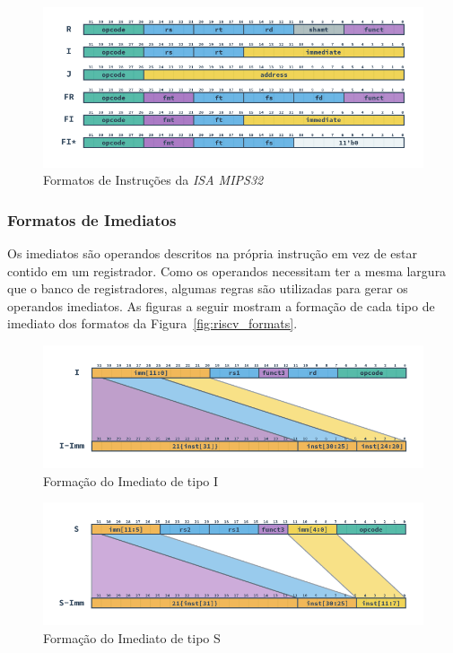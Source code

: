         \begin{figure}[H]
        \centering
            \includegraphics[width=1\linewidth]{../images/MIPS_Formats.png}
            \caption{Formatos de Instruções da \textit{ISA MIPS32}
                }\label{fig:mips_formats}
        \end{figure}

        \subsubsection{Formatos de Imediatos}
        { Os imediatos são operandos descritos na própria instrução em vez de estar
            contido em um registrador. Como os operandos necessitam ter a mesma largura
            que o banco de registradores, algumas regras são utilizadas para gerar os
            operandos imediatos. As figuras a seguir mostram a formação de cada tipo de
            imediato dos formatos da Figura~\ref{fig:riscv_formats}.
        }

        \begin{figure}[H]
        \centering
            \includegraphics[width=1\linewidth]{../images/RV_I_Imm.png}
            \caption{Formação do Imediato de tipo I
                }\label{fig:riscv_i_imm}
        \end{figure}

        \begin{figure}[H]
        \centering
            \includegraphics[width=1\linewidth]{../images/RV_S_Imm.png}
            \caption{Formação do Imediato de tipo S
                }\label{fig:riscv_s_imm}
        \end{figure}

